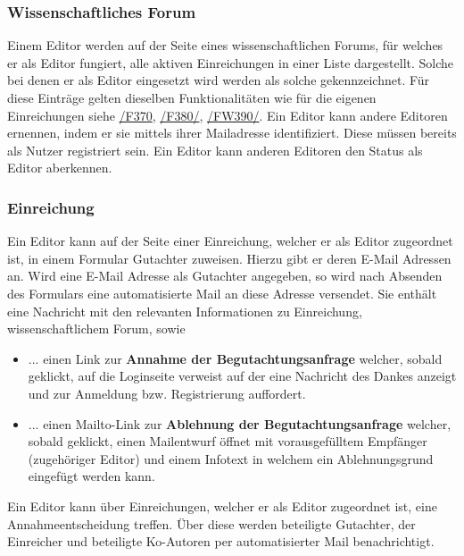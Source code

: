 \subsubsection{Wissenschaftliches Forum}
\begin{description}
     Einem Editor werden auf der Seite eines wissenschaftlichen Forums, für
    welches er als Editor fungiert, alle aktiven Einreichungen in einer Liste dargestellt.
    Solche bei denen er als Editor eingesetzt wird werden als solche gekennzeichnet.
    Für diese Einträge gelten dieselben Funktionalitäten wie für die
    eigenen Einreichungen siehe \hyperref[funkt:370]{/F370}, \hyperref[funkt:380]{/F380/}, \hyperref[funkt:390]{/FW390/}.
     Ein Editor kann andere Editoren ernennen, indem er sie mittels ihrer Mailadresse identifiziert.
    Diese müssen bereits als Nutzer registriert sein.
     Ein Editor kann anderen Editoren den Status als Editor aberkennen.
\end{description}

\subsubsection{Einreichung}
\begin{description}
     Ein Editor kann auf der Seite einer Einreichung, welcher er als Editor zugeordnet ist,
    in einem Formular Gutachter zuweisen. Hierzu gibt er deren E-Mail Adressen an.
     Wird eine E-Mail Adresse als Gutachter angegeben, so wird nach Absenden des Formulars
    eine automatisierte Mail an diese Adresse versendet. Sie enthält eine Nachricht mit den relevanten
    Informationen zu Einreichung, wissenschaftlichem Forum, sowie
    \begin{itemize}
        \item ... einen Link zur \textbf{Annahme der Begutachtungsanfrage} welcher, sobald geklickt,
        auf die Loginseite verweist auf der eine Nachricht des Dankes anzeigt und zur Anmeldung bzw.
        Registrierung auffordert.
        \item ... einen Mailto-Link zur \textbf{Ablehnung der Begutachtungsanfrage} welcher, sobald
        geklickt, einen Mailentwurf öffnet mit vorausgefülltem Empfänger (zugehöriger Editor)
        und einem Infotext in welchem ein Ablehnungsgrund eingefügt werden kann.
    \end{itemize}
     Ein Editor kann über Einreichungen, welcher er als Editor zugeordnet ist,
    eine Annahmeentscheidung treffen. Über diese werden beteiligte Gutachter, der Einreicher und beteiligte Ko-Autoren
    per automatisierter Mail benachrichtigt.
\end{description}

